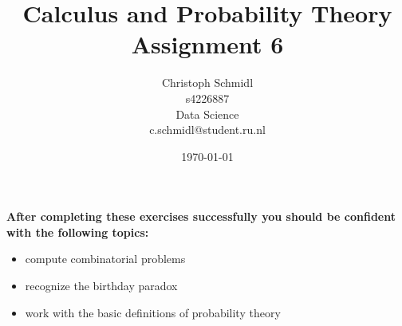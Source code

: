\documentclass[a4paper]{article}
\title{Calculus and Probability Theory\\ Assignment 6}
\author{Christoph Schmidl\\
s4226887\\
Data Science\\
c.schmidl@student.ru.nl\\}
\date{\today}
\begin{document}
\maketitle





\textbf{After completing these exercises successfully you should be confident with the following topics:}

\begin{itemize}
	\item compute combinatorial problems
	\item recognize the birthday paradox
	\item work with the basic definitions of probability theory
\end{itemize}
\vspace{1em}
\end{document}
